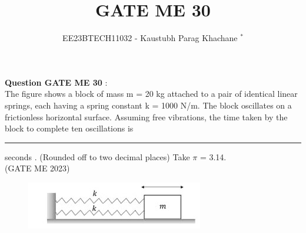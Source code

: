 \documentclass[journal,12pt,twocolumn]{IEEEtran}
\theoremstyle{remark}
\begin{document}

\vspace{3cm}

\Large\title{GATE ME 30}
\large\author{EE23BTECH11032 - Kaustubh Parag Khachane $^{*}$%
}
\maketitle
\newpage
\bigskip

\renewcommand{\thefigure}{\theenumi}
\renewcommand{\thetable}{\theenumi}
\large\textbf{Question GATE ME 30} :\\
The figure shows a block of mass m = 20 kg attached to a pair of identical linear springs, each having a spring constant k = 1000 N/m. The block oscillates on a frictionless horizontal surface. Assuming free vibrations, the time taken by the block to complete ten oscillations is \rule{1cm}{0.15mm} seconds . (Rounded off to two decimal places) Take $\pi$ = 3.14. \\ \hfill(GATE ME 2023)

\begin{figure}[!ht]
\centering
\begin{center}
\includegraphics[width=\columnwidth]{questiondiagram}
\end{center}
\end{figure}
\end{document}
